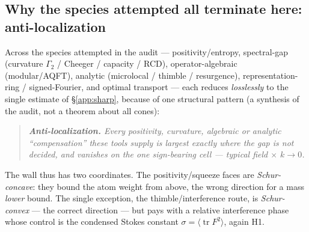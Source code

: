 \subsection{Why the species attempted all terminate here: anti-localization}
Across the species attempted in the audit --- positivity/entropy, spectral-gap
(curvature $\Gamma_2$ / Cheeger / capacity / RCD), operator-algebraic
(modular/AQFT), analytic (microlocal / thimble / resurgence), representation-ring
/ signed-Fourier, and optimal transport --- each reduces \emph{losslessly} to the
single estimate of \S\ref{app:sharp}, because of one structural pattern (a synthesis
of the audit, not a theorem about all cones):
\begin{quote}\itshape
\textbf{Anti-localization.} Every positivity, curvature, algebraic or analytic
``compensation'' these tools supply is largest exactly where the gap is \emph{not}
decided, and vanishes on the one sign-bearing cell --- typical field $\times$
$k\to0$.
\end{quote}
The wall thus has two coordinates. The positivity/squeeze faces are
\emph{Schur-concave}: they bound the atom weight from above, the wrong direction
for a mass \emph{lower} bound. The single exception, the thimble/interference
route, is \emph{Schur-convex} --- the correct direction --- but pays with a
relative interference phase whose control is the condensed Stokes constant
$\sigma=\langle\operatorname{tr}F^{2}\rangle$, again H1.

